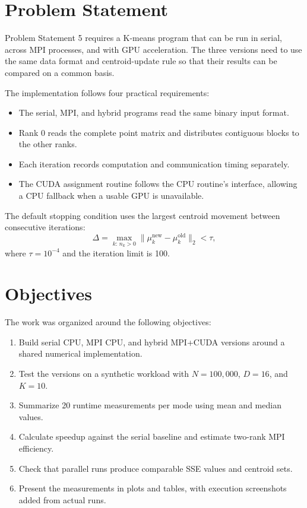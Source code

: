 \documentclass[conference]{IEEEtran}
\begin{document}
\section{Problem Statement}
\label{sec:problem}
Problem Statement 5 requires a K-means program that can be run in serial, across MPI processes, and with GPU acceleration. The three versions need to use the same data format and centroid-update rule so that their results can be compared on a common basis.

The implementation follows four practical requirements:
\begin{itemize}
  \item The serial, MPI, and hybrid programs read the same binary input format.
  \item Rank 0 reads the complete point matrix and distributes contiguous blocks to the other ranks.
  \item Each iteration records computation and communication timing separately.
  \item The CUDA assignment routine follows the CPU routine's interface, allowing a CPU fallback when a usable GPU is unavailable.
\end{itemize}

The default stopping condition uses the largest centroid movement between consecutive iterations:
\[
  \Delta = \max_{k:\, n_k > 0}\big\|\mu_k^{\mathrm{new}} - \mu_k^{\mathrm{old}}\big\|_2 < \tau,
\]
where $\tau=10^{-4}$ and the iteration limit is 100.

\section{Objectives}
\label{sec:objectives}
The work was organized around the following objectives:
\begin{enumerate}
  \item Build serial CPU, MPI CPU, and hybrid MPI+CUDA versions around a shared numerical implementation.
  \item Test the versions on a synthetic workload with $N=100{,}000$, $D=16$, and $K=10$.
  \item Summarize 20 runtime measurements per mode using mean and median values.
  \item Calculate speedup against the serial baseline and estimate two-rank MPI efficiency.
  \item Check that parallel runs produce comparable SSE values and centroid sets.
  \item Present the measurements in plots and tables, with execution screenshots added from actual runs.
\end{enumerate}
\end{document}
